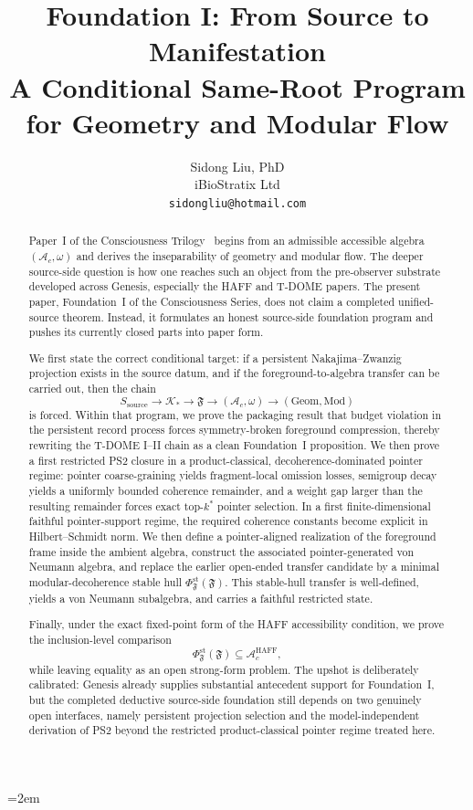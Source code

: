 \documentclass[12pt]{article}
\title{%
  \textbf{Foundation I: From Source to Manifestation}\\
  \textbf{A Conditional Same-Root Program for Geometry and Modular Flow}%
}
\author{
  Sidong Liu, PhD \\
  \small iBioStratix Ltd \\
  \small \texttt{sidongliu@hotmail.com}
}
\date{\FIDisplayDate}
\theoremstyle{definition}
\theoremstyle{remark}
\begin{document}
\emergencystretch=2em
\raggedbottom
{}

\maketitle

\begin{abstract}
Paper~I of the Consciousness Trilogy~\cite{PaperI} begins from an
admissible accessible algebra \((\mathcal A_c,\omega)\) and derives the
inseparability of geometry and modular flow. The deeper source-side
question is how one reaches such an object from the pre-observer
substrate developed across Genesis, especially the HAFF and T-DOME
papers. The present paper, Foundation~I of the Consciousness Series,
does not claim a completed unified-source theorem. Instead, it
formulates an honest source-side foundation program and pushes its
currently closed parts into paper form.

We first state the correct conditional target: if a persistent
Nakajima--Zwanzig projection exists in the source datum, and if the
foreground-to-algebra transfer can be carried out, then the chain
\[
S_{\mathrm{source}} \to \mathcal K_* \to \mathfrak F \to (\mathcal A_c,\omega)
\to (\mathrm{Geom},\mathrm{Mod})
\]
is forced. Within that program, we prove the packaging result that
budget violation in the persistent record process forces
symmetry-broken foreground compression, thereby rewriting the T-DOME
I--II chain as a clean Foundation~I proposition. We then prove a first
restricted PS2 closure in a product-classical, decoherence-dominated
pointer regime: pointer coarse-graining yields fragment-local omission
losses, semigroup decay yields a uniformly bounded coherence remainder,
and a weight gap larger than the resulting remainder forces exact
top-\(k^*\) pointer selection. In a first finite-dimensional faithful
pointer-support regime, the required coherence constants become
explicit in Hilbert--Schmidt norm. We then define a
pointer-aligned realization of the foreground frame inside the ambient
algebra, construct the associated pointer-generated von Neumann
algebra, and replace the earlier open-ended transfer candidate by a
minimal modular-decoherence stable hull
\(\Phi_{\mathfrak F}^{\mathrm{st}}(\mathfrak F)\). This stable-hull
transfer is well-defined, yields a von Neumann subalgebra, and carries a
faithful restricted state.

Finally, under the exact fixed-point form of the HAFF accessibility
condition, we prove the inclusion-level comparison
\[
\Phi_{\mathfrak F}^{\mathrm{st}}(\mathfrak F)\subseteq
\mathcal A_c^{\mathrm{HAFF}},
\]
while leaving equality as an open strong-form problem. The upshot is
deliberately calibrated: Genesis already supplies substantial antecedent
support for Foundation~I, but the completed deductive source-side
foundation still depends on two genuinely open interfaces, namely
persistent projection selection and the model-independent derivation of
PS2 beyond the restricted product-classical pointer regime treated here.
\end{abstract}
\end{document}
